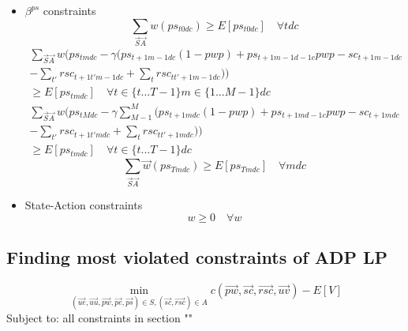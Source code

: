 \documentclass{article}
\begin{document}
\begin{itemize}
	\item $\beta^{ps}$ constraints
	\begin{equation}
		 \sum_{\vec{S}\vec{A}}w (ps_{t0dc}) \ge E[ps_{t0dc}] \quad \forall tdc 
	\end{equation}
	\begin{multline}
		\sum_{\vec{S}\vec{A}}w \bigg( ps_{tmdc} - 
				\gamma \Big( ps_{t+1m-1dc}(1-pwp) + ps_{t+1m-1d-1c} pwp - sc_{t+1m-1dc} \\ 
				 - \sum_{t'} rsc_{t+1t'm-1dc} + \sum_{t} rsc_{tt'+1m-1dc} \Big) \bigg) \\ 
				 \ge E[ps_{tmdc}] \quad \forall t \in \{t...T-1 \} m \in \{1 ... M-1 \} dc
	\end{multline}
	\begin{multline}
		\sum_{\vec{S}\vec{A}}w \bigg( ps_{tMdc} - 
				\gamma \sum_{M-1}^{M} \Big( ps_{t+1mdc}(1-pwp) + ps_{t+1md-1c} pwp - sc_{t+1mdc} \\ 
				 - \sum_{t'} rsc_{t+1t'mdc} + \sum_{t} rsc_{tt'+1mdc} \Big) \bigg) \\ 
				 \ge E[ps_{tmdc}] \quad \forall t \in \{t...T-1 \} dc
	\end{multline}
	\begin{equation}
		\sum_{\vec{S}\vec{A}} \vec{w} (ps_{Tmdc}) \ge E[ps_{Tmdc}] \quad \forall mdc
	\end{equation}
	
	\item State-Action constraints
	\begin{equation}
		w \ge 0 \quad \forall w
	\end{equation}
\end{itemize}

\subsection{Finding most violated constraints of ADP LP}
\label{Pricing Problem}
\begin{equation}
	\min_{(\vec{ue}, \vec{uu}, \vec{pw}, \vec{pe}, \vec{ps}) \in S,  (\vec{sc}, \vec{rsc}) \in A } c(\vec{pw},\vec{sc},\vec{rsc},\vec{uv}) - E[V]
\end{equation}
Subject to:
all constraints in section ""
\end{document}
